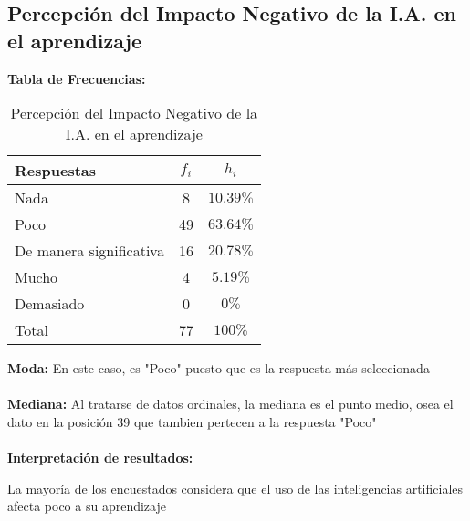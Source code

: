 \subsection{Percepción del Impacto Negativo de la I.A. en el aprendizaje}
\textbf{Tabla de Frecuencias:}

\begin{table}[h!]
	\centering
	\renewcommand{\arraystretch}{1.5}
	\begin{tabular}{l c c }
		\hline
		Respuestas & \(f_i\) & \(h_i\) \\
		\hline
		Nada & 8 & \(10.39\%\) \\
		Poco & 49 & \(63.64\%\) \\
		De manera significativa & 16 & \(20.78\%\) \\
		Mucho & 4 & \(5.19\%\) \\
		Demasiado & 0 & \(0\%\) \\
		\hline
		Total & 77 & \(100\%\) \\
		\hline
	\end{tabular}
	\caption{Percepción del Impacto Negativo de la I.A. en el aprendizaje}
	\label{tabla:percepciónNegativaEnElAprendizaje}
\end{table}

\textbf{Moda:} En este caso, es "Poco" puesto que es la respuesta más seleccionada \\ \\
\textbf{Mediana:} Al tratarse de datos ordinales, la mediana es el punto medio, osea el dato en la posición 39 que tambien pertecen a la respuesta "Poco" \\ \\
\textbf{Interpretación de resultados:}

La mayoría de los encuestados considera que el uso de las inteligencias artificiales afecta poco a su aprendizaje